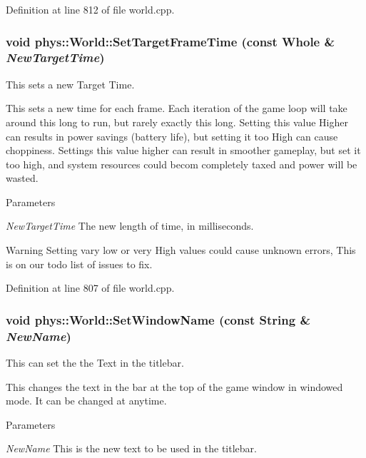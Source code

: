 Definition at line 812 of file world.cpp.

\hypertarget{classphys_1_1World_ad95b5a5ad73e0a05826b5bd834876333}{
\subsubsection[{SetTargetFrameTime}]{\setlength{\rightskip}{0pt plus 5cm}void phys::World::SetTargetFrameTime (const {\bf Whole} \& {\em NewTargetTime})}}
\label{da/ddf/classphys_1_1World_ad95b5a5ad73e0a05826b5bd834876333}


This sets a new Target Time. 

This sets a new time for each frame. Each iteration of the game loop will take around this long to run, but rarely exactly this long. Setting this value Higher can results in power savings (battery life), but setting it too High can cause choppiness. Settings this value higher can result in smoother gameplay, but set it too high, and system resources could becom completely taxed and power will be wasted. 
\begin{DoxyParams}{Parameters}
\item[{\em NewTargetTime}]The new length of time, in milliseconds. \end{DoxyParams}
\begin{DoxyWarning}{Warning}
Setting vary low or very High values could cause unknown errors, This is on our todo list of issues to fix. 
\end{DoxyWarning}


Definition at line 807 of file world.cpp.

\hypertarget{classphys_1_1World_acd0dff342c08fe3008226488b7c53d97}{
\subsubsection[{SetWindowName}]{\setlength{\rightskip}{0pt plus 5cm}void phys::World::SetWindowName (const {\bf String} \& {\em NewName})}}
\label{da/ddf/classphys_1_1World_acd0dff342c08fe3008226488b7c53d97}


This can set the the Text in the titlebar. 

This changes the text in the bar at the top of the game window in windowed mode. It can be changed at anytime. 
\begin{DoxyParams}{Parameters}
\item[{\em NewName}]This is the new text to be used in the titlebar. \end{DoxyParams}


